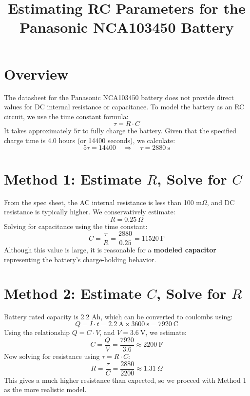 \documentclass[]{article}
\title{Estimating RC Parameters for the Panasonic NCA103450 Battery}
\author{}
\date{}
\begin{document}
	
	\maketitle
	
	\section*{Overview}
	
	The datasheet for the Panasonic NCA103450 battery does not provide direct values for DC internal resistance or capacitance. To model the battery as an RC circuit, we use the time constant formula:
	\begin{equation*}
		\tau = R \cdot C
	\end{equation*}
	It takes approximately \(5\tau\) to fully charge the battery. Given that the specified charge time is 4.0 hours (or 14400 seconds), we calculate:
	\begin{equation*}
		5\tau = 14400 \quad \Rightarrow \quad \tau = 2880\ \text{s}
	\end{equation*}
	
	\section*{Method 1: Estimate $R$, Solve for $C$}
	
	From the spec sheet, the AC internal resistance is less than 100 m$\Omega$, and DC resistance is typically higher. We conservatively estimate:
	\begin{equation*}
		R = 0.25\ \Omega
	\end{equation*}
	Solving for capacitance using the time constant:
	\begin{equation*}
		C = \frac{\tau}{R} = \frac{2880}{0.25} = 11520\ \text{F}
	\end{equation*}
	Although this value is large, it is reasonable for a \textbf{modeled capacitor} representing the battery’s charge-holding behavior.
	
	\section*{Method 2: Estimate $C$, Solve for $R$}
	
	Battery rated capacity is 2.2 Ah, which can be converted to coulombs using:
	\begin{equation*}
		Q = I \cdot t = 2.2\ \text{A} \times 3600\ \text{s} = 7920\ \text{C}
	\end{equation*}
	Using the relationship \(Q = C \cdot V\), and \(V = 3.6\ \text{V}\), we estimate:
	\begin{equation*}
		C = \frac{Q}{V} = \frac{7920}{3.6} \approx 2200\ \text{F}
	\end{equation*}
	Now solving for resistance using \(\tau = R \cdot C\):
	\begin{equation*}
		R = \frac{\tau}{C} = \frac{2880}{2200} \approx 1.31\ \Omega
	\end{equation*}
	This gives a much higher resistance than expected, so we proceed with Method 1 as the more realistic model.
	
\end{document}

